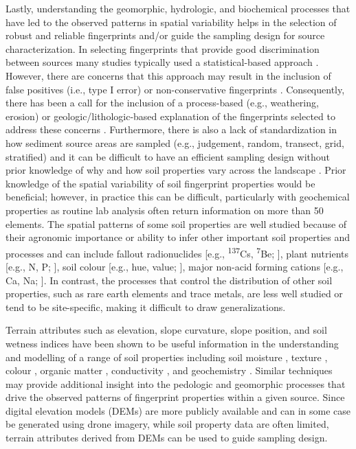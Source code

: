 \documentclass[
  number]{elsarticle}
\begin{document}
Lastly, understanding the geomorphic, hydrologic, and biochemical
processes that have led to the observed patterns in spatial variability
helps in the selection of robust and reliable fingerprints and/or guide
the sampling design for source characterization. In selecting
fingerprints that provide good discrimination between sources many
studies typically used a statistical-based approach \citep{collins1997}.
However, there are concerns that this approach may result in the
inclusion of false positives (i.e., type I error) or non-conservative
fingerprints \citep{koiter2013}. Consequently, there has been a call for
the inclusion of a process-based (e.g., weathering, erosion) or
geologic/lithologic-based explanation of the fingerprints selected to
address these concerns \citep{collins2020}. Furthermore, there is also a
lack of standardization in how sediment source areas are sampled (e.g.,
judgement, random, transect, grid, stratified) and it can be difficult
to have an efficient sampling design without prior knowledge of why and
how soil properties vary across the landscape \citep{lunamiño2024}.
Prior knowledge of the spatial variability of soil fingerprint
properties would be beneficial; however, in practice this can be
difficult, particularly with geochemical properties as routine lab
analysis often return information on more than 50 elements. The spatial
patterns of some soil properties are well studied because of their
agronomic importance or ability to infer other important soil properties
and processes and can include fallout radionuclides {[}e.g.,
\textsuperscript{137}Cs, \textsuperscript{7}Be; \citep{ritchie1970}{]},
plant nutrients {[}e.g., N, P; \citep{vasu2017}{]}, soil colour {[}e.g.,
hue, value; \citep{viscarrarossel2006}{]}, major non-acid forming
cations {[}e.g., Ca, Na; \citep{sun2021}{]}. In contrast, the processes
that control the distribution of other soil properties, such as rare
earth elements and trace metals, are less well studied or tend to be
site-specific, making it difficult to draw generalizations.

Terrain attributes such as elevation, slope curvature, slope position,
and soil wetness indices have been shown to be useful information in the
understanding and modelling of a range of soil properties including soil
moisture \citep{beaudette2013}, texture \citep{kokulan2018}, colour
\citep{brown2004}, organic matter \citep{zhang2012}, conductivity
\citep{umali2012}, and geochemistry \citep{lima2023}. Similar techniques
may provide additional insight into the pedologic and geomorphic
processes that drive the observed patterns of fingerprint properties
within a given source. Since digital elevation models (DEMs) are more
publicly available and can in some case be generated using drone
imagery, while soil property data are often limited, terrain attributes
derived from DEMs can be used to guide sampling design.
\end{document}
